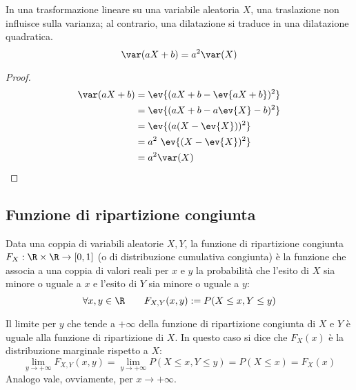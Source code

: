 \begin{prop}
	In una trasformazione lineare su una variabile aleatoria $X$, una traslazione non influisce sulla varianza; al contrario, una dilatazione si traduce in una dilatazione quadratica.
	\begin{equation*}
		\var(aX+b)=a^2\var(X)
	\end{equation*}
\end{prop}
\begin{proof}
	\begin{align*}
		\var(aX+b) & = \ev{(aX+b-\ev{aX+b})^2} \\
		           & = \ev{(aX+b-a\ev{X}-b)^2} \\
		           & = \ev{(a(X-\ev{X}))^2}    \\
		           & = a^2~\ev{(X-\ev{X})^2}   \\
		           & = a^2 \var(X)             \\
	\end{align*}
\end{proof}



\subsection{Funzione di ripartizione congiunta}
\begin{defin}
	Data una coppia di variabili aleatorie $X, Y$, la funzione di ripartizione congiunta $F_X:\R\times\R\to[0,1]$ (o di distribuzione cumulativa congiunta) è la funzione che associa a una coppia di valori reali per $x$ e $y$ la probabilità che l'esito di $X$ sia minore o uguale a $x$ e l'esito di $Y$ sia minore o uguale a $y$:
	\begin{equation*}
		\forall x,y\in\R\qquad F_{X,Y}(x,y):=P(X\leq x, Y\leq y) \\
	\end{equation*}
\end{defin}

Il limite per $y$ che tende a $+\infty$ della funzione di ripartizione congiunta di $X$ e $Y$ è uguale alla funzione di ripartizione di $X$. In questo caso si dice che $F_X(x)$ è la distribuzione marginale rispetto a $X$:
\begin{equation} \label{eq:distrmargin}
	\lim_{y\to+\infty}F_{X,Y}(x, y) = \lim_{y\to+\infty}P(X\leq x,Y\leq y) = P(X\leq x) = F_X(x)
\end{equation}
Analogo vale, ovviamente, per $x\to+\infty$.



